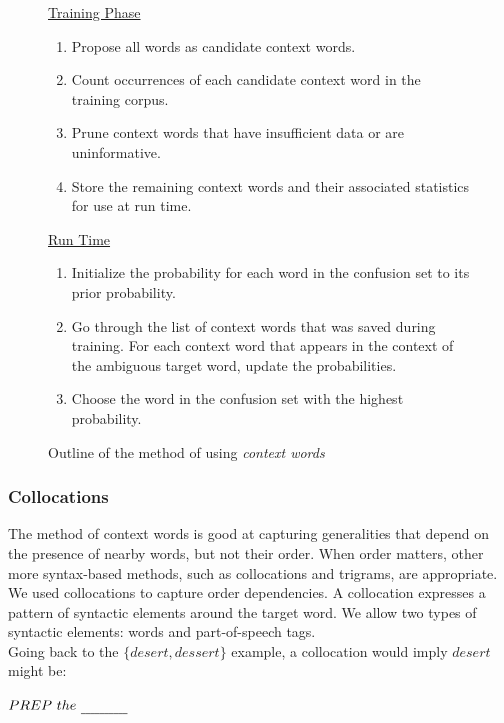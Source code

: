 \begin{figure}[H]
    \caption{Outline of the method of using \textit{context words}}
    \ul{Training Phase}\\
    \begin{enumerate}
        \item Propose all words as candidate context words.
        \item Count occurrences of each candidate context word in the training
        corpus.
        \item Prune context words that have insufficient data or are
        uninformative.
        \item Store the remaining context words and their associated statistics
        for use at run time.
    \end{enumerate}
    \vspace{\baselineskip}
    \ul{Run Time}\\
    \begin{enumerate}
        \item Initialize the probability for each word in the confusion set to
        its prior probability.
        \item Go through the list of context words that was saved during
        training. For each context word that appears in the context of the
        ambiguous target word, update the probabilities.
        \item Choose the word in the confusion set with the highest probability.
    \end{enumerate}
    \vspace{\baselineskip}
\end{figure}

\subsubsection{Collocations}

The method of context words is good at capturing generalities that depend on
the presence of nearby words, but not their order. When order matters, other
more syntax-based methods, such as collocations and trigrams, are appropriate.
We used collocations to capture order dependencies. A collocation expresses a
pattern of syntactic elements around the target word. We allow two types of
syntactic elements: words and part-of-speech tags.\\ Going back to the
\(\{desert, dessert\}\) example, a collocation would imply \(desert\) might be:
\begin{center}
    \(PREP \text{\ }the\text{\ \ul{~~~~~~~~~~}}\)
\end{center}

